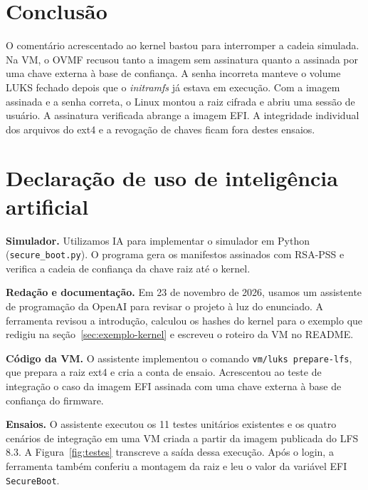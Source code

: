\documentclass[12pt,a4paper,oneside,openany,brazil,chapter=TITLE,section=TITLE]{abntex2}
\begin{document}
\section{Conclusão}

O comentário acrescentado ao kernel bastou para interromper a cadeia simulada.
Na VM, o OVMF recusou tanto a imagem sem assinatura quanto a assinada por uma
chave externa à base de confiança. A senha incorreta manteve o volume LUKS
fechado depois que o \textit{initramfs} já estava em execução. Com a imagem
assinada e a senha correta, o Linux montou a raiz cifrada e abriu uma sessão de
usuário. A assinatura verificada abrange a imagem EFI. A integridade individual
dos arquivos do ext4 e a revogação de chaves ficam fora destes ensaios.

\postextual
\nocite{assistente-ia}


\section*{Declaração de uso de inteligência artificial}

\noindent\textbf{Simulador.} Utilizamos IA para implementar o simulador em Python
(\texttt{secure\_boot.py}). O programa gera os manifestos assinados com RSA-PSS
e verifica a cadeia de confiança da chave raiz até o kernel.

\smallskip
\noindent\textbf{Redação e documentação.} Em 23 de novembro de 2026, usamos um
assistente de programação da OpenAI para revisar o projeto à luz do enunciado.
A ferramenta revisou a introdução, calculou os hashes do kernel para o exemplo
que redigiu na seção~\ref{sec:exemplo-kernel} e escreveu o roteiro da VM no README.

\smallskip
\noindent\textbf{Código da VM.} O assistente implementou o comando
\texttt{vm/luks prepare-lfs}, que prepara a raiz ext4 e cria a conta de ensaio.
Acrescentou ao teste de integração o caso da imagem EFI assinada com uma chave
externa à base de confiança do firmware.

\smallskip
\noindent\textbf{Ensaios.} O assistente executou os 11 testes unitários existentes e
os quatro cenários de integração em uma VM criada a partir da imagem publicada
do LFS 8.3. A Figura~\ref{fig:testes} transcreve a saída dessa execução. Após
o login, a ferramenta também conferiu a montagem da raiz e leu o valor da
variável EFI \texttt{SecureBoot}.
\end{document}
